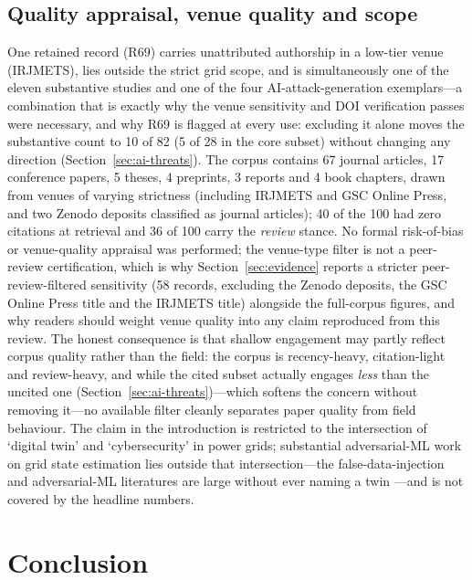 \documentclass[preprint,12pt]{elsarticle}
\renewcommand{\_}{\plainunderscore\allowbreak}
\begin{document}
\subsection{Quality appraisal, venue quality and scope}
One retained record (R69) carries unattributed authorship in a low-tier venue (IRJMETS),
lies outside the strict grid scope, and is simultaneously one of the eleven substantive
studies and one of the four AI-attack-generation exemplars---a combination that is exactly
why the venue sensitivity and DOI verification passes were necessary, and why R69 is
flagged at every use: excluding it alone moves the substantive count to 10 of 82 (5 of 28
in the core subset) without changing any direction (Section~\ref{sec:ai-threats}).
The corpus contains 67 journal articles, 17 conference
papers, 5 theses, 4 preprints, 3
reports and 4 book chapters, drawn from venues of varying
strictness (including IRJMETS and
GSC Online Press, and two Zenodo deposits classified as journal articles); 40 of the 100
had zero citations at retrieval and 36 of 100 carry the \emph{review} stance. No formal
risk-of-bias or venue-quality appraisal was performed; the venue-type filter is not a
peer-review certification, which is why Section~\ref{sec:evidence} reports a stricter
peer-review-filtered sensitivity (58 records, excluding the Zenodo deposits, the GSC
Online Press title and the IRJMETS title) alongside the full-corpus figures, and why
readers should weight venue quality into any claim reproduced from this review. The
honest consequence is that shallow engagement may partly reflect corpus quality rather
than the field: the corpus is recency-heavy, citation-light and review-heavy, and while
the cited subset actually engages \emph{less} than the uncited one
(Section~\ref{sec:ai-threats})---which softens the concern without removing it---no
available filter cleanly separates paper quality from field behaviour. The claim in the
introduction is restricted to
the intersection of `digital twin' and `cybersecurity' in power grids; substantial
adversarial-ML work on grid state estimation lies outside that intersection---the
false-data-injection and adversarial-ML literatures are large without ever naming a twin
\cite{liu2011,liang2017,biggio2018}---and is not covered
by the headline numbers.

\section{Conclusion}\label{sec:conclusion}
\end{document}
